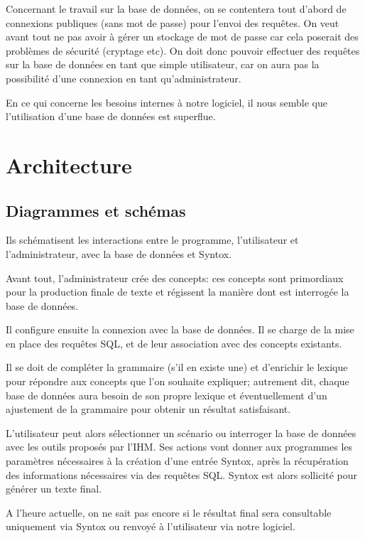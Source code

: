 \documentclass[12pt]{report}
\begin{document}
Concernant le travail sur la base de données, on se contentera tout
d'abord de connexions publiques (sans mot de passe) pour l'envoi des
requêtes. On veut avant tout ne pas avoir à gérer un stockage de mot de
passe car cela poserait des problèmes de sécurité (cryptage etc).
On doit donc pouvoir effectuer des requêtes sur la base de données en
tant que simple utilisateur, car on aura pas la possibilité d'une
connexion en tant qu'administrateur.

En ce qui concerne les besoins internes à notre logiciel, il nous semble
que l'utilisation d'une base de données est superflue.  


\chapter{Architecture}

\section{Diagrammes et schémas}

Ils schématisent les interactions entre le programme, l'utilisateur et l'administrateur, avec la base de données et Syntox.

Avant tout, l'administrateur crée des concepts: ces concepts sont primordiaux pour la production finale de texte et régissent la manière dont est interrogée la base de données.

Il configure ensuite la connexion avec la base de données. Il se charge de la mise en place des requêtes SQL, et de leur association avec des concepts existants.

Il se doit de compléter la grammaire (s'il en existe une) et d'enrichir le lexique pour répondre aux concepts que l'on souhaite expliquer; autrement dit, chaque base de données aura besoin de son propre lexique et éventuellement d'un ajustement de la grammaire pour obtenir un résultat satisfaisant.

L'utilisateur peut alors sélectionner un scénario ou interroger la base de données avec les outils proposés par l'IHM. Ses actions vont donner aux programmes les paramètres nécessaires à la création d'une entrée Syntox, après la récupération des informations nécessaires via des requêtes SQL. Syntox est alors sollicité pour générer un texte final.

A l'heure actuelle, on ne sait pas encore si le résultat final sera consultable uniquement via Syntox ou renvoyé à l'utilisateur via notre logiciel.
\end{document}
